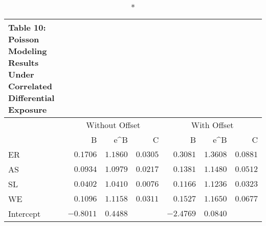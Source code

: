 \begin{longtable}{l|rrrrrr}
\caption*{
{\large Table 10: Poisson Modeling Results Under Correlated Differential Exposure}
} \\ 
\toprule
\multicolumn{1}{l}{} & \multicolumn{3}{c}{Without Offset} & \multicolumn{3}{c}{With Offset} \\ 
\cmidrule(lr){2-4} \cmidrule(lr){5-7}
\multicolumn{1}{l}{} & B & e\textasciicircum{}B & C & B & e\textasciicircum{}B & C \\ 
\midrule
ER & $0.1706$ & $1.1860$ & $0.0305$ & $0.3081$ & $1.3608$ & $0.0881$ \\ 
AS & $0.0934$ & $1.0979$ & $0.0217$ & $0.1381$ & $1.1480$ & $0.0512$ \\ 
SL & $0.0402$ & $1.0410$ & $0.0076$ & $0.1166$ & $1.1236$ & $0.0323$ \\ 
WE & $0.1096$ & $1.1158$ & $0.0311$ & $0.1527$ & $1.1650$ & $0.0677$ \\ 
Intercept & $-0.8011$ & $0.4488$ &  & $-2.4769$ & $0.0840$ &  \\ 
\bottomrule
\end{longtable}

